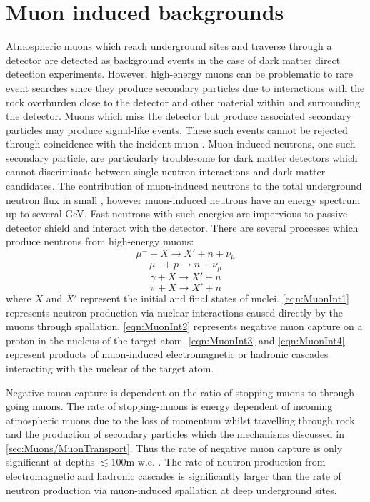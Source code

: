 \section{Muon induced backgrounds}\label{sec:Muons/InducedBackgrounds}
Atmospheric muons which reach underground sites and traverse through a detector are detected as background events in the case of dark matter direct detection experiments. However, high-energy muons can be problematic to rare event searches since they produce secondary particles due to interactions with the rock overburden close to the detector and other material within and surrounding the detector. Muons which miss the detector but produce associated secondary particles may produce signal-like events. These such events cannot be rejected through coincidence with the incident muon \cite{mei,Lindote:2008nq}. Muon-induced neutrons, one such secondary particle, are particularly troublesome for dark matter detectors which cannot discriminate between single neutron interactions and dark matter candidates. The contribution of muon-induced neutrons to the total underground neutron flux in small \cite{LZ_SIMS}, however muon-induced neutrons have an energy spectrum up to several GeV. Fast neutrons with such energies are impervious to passive detector shield and interact with the detector. There are several processes which produce neutrons from high-energy muons:
\begin{equation}\label{eqn:MuonInt1}
    \mu^-+X\rightarrow X' + n+\nu_\mu
\end{equation}
\begin{equation}\label{eqn:MuonInt2}
    \mu^-+p\rightarrow n+\nu_\mu
\end{equation}
\begin{equation}\label{eqn:MuonInt3}
    \gamma+X\rightarrow X'+n
\end{equation}
\begin{equation}\label{eqn:MuonInt4}
    \pi+X\rightarrow X'+n
\end{equation} 
where $X$ and $X'$ represent the initial and final states of nuclei. \autoref{eqn:MuonInt1} represents neutron production via nuclear interactions caused directly by the muons through spallation. \autoref{eqn:MuonInt2} represents negative muon capture on a proton in the nucleus of the target atom. \autoref{eqn:MuonInt3} and \autoref{eqn:MuonInt4} represent products of muon-induced electromagnetic or hadronic cascades interacting with the nuclear of the target atom.

Negative muon capture is dependent on the ratio of stopping-muons to through-going muons. The rate of stopping-muons is energy dependent of incoming atmospheric muons due to the loss of momentum whilst travelling through rock and the production of secondary particles which the mechanisms discussed in \autoref{sec:Muons/MuonTransport}. Thus the rate of negative muon capture is only significant at depths $\lesssim100\text{m w.e.}$ \cite{Gaisser_Engel_Resconi_2016}. The rate of neutron production from electromagnetic and hadronic cascades is significantly larger than the rate of neutron production via muon-induced spallation at deep underground sites.

